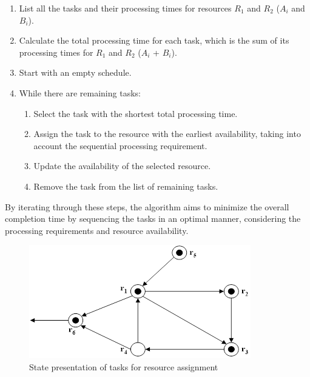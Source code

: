 \documentclass{article}
\begin{document}
\begin{enumerate}
  \item List all the tasks and their processing times for resources $R_1$ and $R_2$ ($A_i$ and $B_i$).
  \item Calculate the total processing time for each task, which is the sum of its processing times for $R_1$ and $R_2$ ($A_i$ + $B_i$).
  \item Start with an empty schedule.
  \item While there are remaining tasks:
  \begin{enumerate}
    \item Select the task with the shortest total processing time.
    \item Assign the task to the resource with the earliest availability, taking into account the sequential processing requirement.
    \item Update the availability of the selected resource.
    \item Remove the task from the list of remaining tasks.
  \end{enumerate}
\end{enumerate}

By iterating through these steps, the algorithm aims to minimize the overall completion time by sequencing the tasks in an optimal manner, considering the processing requirements and resource availability.


\begin{figure}[h!]
  \includegraphics{state.png}
  \caption{State presentation of tasks for resource assignment}
  \label{fig:state}
\end{figure}
\end{document}
